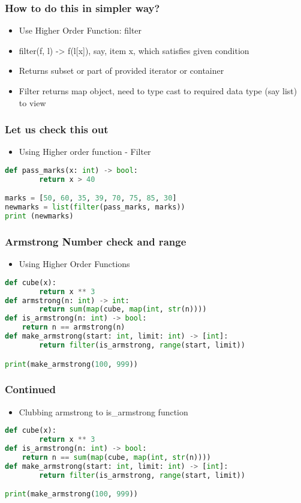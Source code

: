 \documentclass[14pt]{beamer}
\begin{document}
    \begin{frame}[containsverbatim]
        \frametitle{How to do this in simpler way?}
        \begin{itemize}
            \item \alert{Use Higher Order Function: filter}
            \item filter(f, l) -> f(l[x]), say, item x, which satisfies given condition 
            \item Returns subset or part of provided iterator or container
            \item Filter returns map object, need to type cast to required data type (say list) to view
        \end{itemize}
    \end{frame}

    \begin{frame}[containsverbatim]
        \frametitle{Let us check this out}
		\begin{itemize}
		\item Using Higher order function - Filter
		\end{itemize}
        \begin{lstlisting}[language=Python]
def pass_marks(x: int) -> bool:
        return x > 40

marks = [50, 60, 35, 39, 70, 75, 85, 30]
newmarks = list(filter(pass_marks, marks))
print (newmarks)
        \end{lstlisting}
    \end{frame}

    \begin{frame}[containsverbatim]
        \frametitle{Armstrong Number check and range}
		\begin{itemize}
		\item Using Higher Order Functions
		\end{itemize}
        \begin{lstlisting}[language=Python]
def cube(x):
        return x ** 3
def armstrong(n: int) -> int:
        return sum(map(cube, map(int, str(n))))
def is_armstrong(n: int) -> bool:
    return n == armstrong(n)
def make_armstrong(start: int, limit: int) -> [int]:
        return filter(is_armstrong, range(start, limit))

print(make_armstrong(100, 999))
        \end{lstlisting}
    \end{frame}

    \begin{frame}[containsverbatim]
        \frametitle{Continued}
		\begin{itemize}
		\item Clubbing armstrong to is\_armstrong function
		\end{itemize}
        \begin{lstlisting}[language=Python]
def cube(x):
        return x ** 3
def is_armstrong(n: int) -> bool:
    return n == sum(map(cube, map(int, str(n))))
def make_armstrong(start: int, limit: int) -> [int]:
        return filter(is_armstrong, range(start, limit))

print(make_armstrong(100, 999))
        \end{lstlisting}
    \end{frame}
\end{document}

